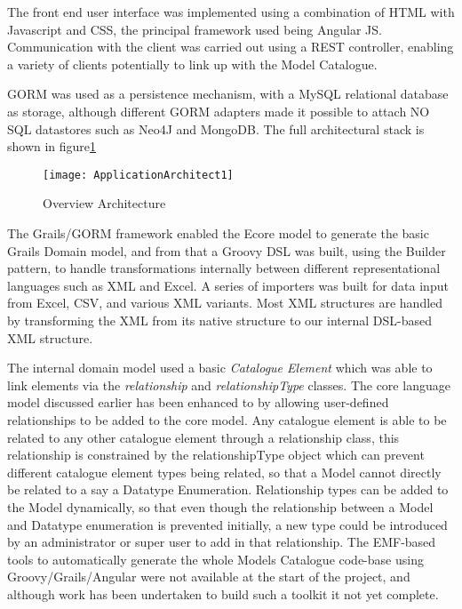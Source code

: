 The front end user interface was implemented using a combination of HTML with Javascript and CSS, the principal framework used being Angular JS. Communication with the client was carried out using a REST controller, enabling a variety of clients potentially to link up with the Model Catalogue.

GORM was used as a persistence mechanism, with a MySQL relational database as storage, although different GORM adapters made it possible to attach NO SQL datastores such as Neo4J and MongoDB. The full architectural stack is shown in figure\ref{fig:ApplicationArchitectMDR}

\begin{figure}[here]
	\texttt{[image: ApplicationArchitect1]}
	\caption{Overview Architecture} 
	\label{fig:ApplicationArchitectMDR}
\end{figure}

The Grails/GORM framework enabled the Ecore model to generate the basic Grails Domain model, and from that a Groovy DSL was built, using the Builder pattern, to handle transformations internally between different representational languages such as XML and Excel. A series of importers was built for data input from Excel, CSV, and various XML variants. Most XML structures are handled by transforming the XML from its native structure to our internal DSL-based XML structure. 

The internal domain model used a basic \emph{Catalogue Element} which was able to link elements via the \emph{relationship} and \emph{relationshipType} classes. The core language model discussed earlier has been enhanced to by allowing user-defined relationships to be added to the core model. Any catalogue element is able to be related to any other catalogue element through a relationship class, this relationship is constrained by the relationshipType object which can prevent different catalogue element types being related, so that a Model cannot directly be related to a say a Datatype Enumeration. Relationship types can be added to the Model dynamically, so that even though the relationship between a Model and Datatype enumeration is prevented initially, a new type could be introduced by an administrator or super user to add in that relationship. The EMF-based tools to automatically generate the whole Models Catalogue code-base using Groovy/Grails/Angular were not available at the start of the project, and although work has been undertaken to build such a toolkit it not yet complete.  

